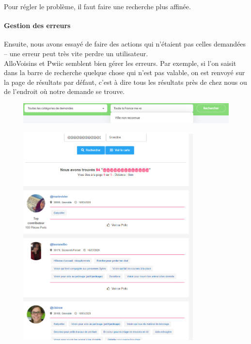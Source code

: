 \documentclass[a4paper,11pt]{article}
\begin{document}
Pour régler le problème, il faut faire une recherche plus affinée.\\

\paragraph{Gestion des erreurs}

Ensuite, nous avons essayé de faire des actions qui n’étaient pas celles demandées -- une erreur peut très vite perdre un utilisateur.\\

AlloVoisins et Pwiic semblent bien gérer les erreurs. Par exemple, si l’on saisit dans la barre de recherche quelque chose
qui n’est pas valable, on est renvoyé sur la page de résultats par défaut, c’est à dire tous les résultats près de
chez nous ou de l’endroit où notre demande se trouve.\\

\begin{figure}[H]
  \includegraphics[width=\linewidth]{images/gestion-erreur-allovoisins.png}
  \label{fig:gestion-erreur-allovoisins}
\end{figure}

\begin{figure}[H]
  \includegraphics[width=350px]{images/gestion-erreur-yakasaider.png}
  \label{fig:gestion-erreur-yakasaider}
\end{figure}
\end{document}
